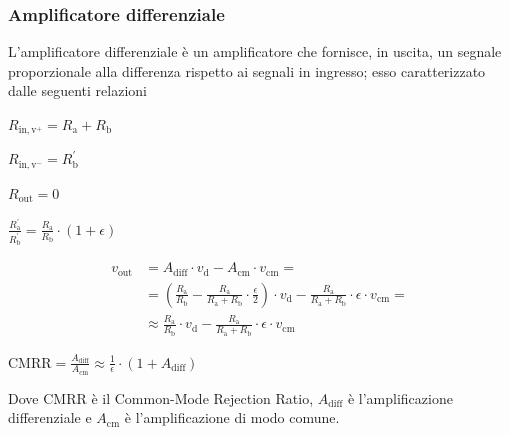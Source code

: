 \documentclass[a4paper]{article}
\begin{document}
			\subsubsection{Amplificatore differenziale}
				L'amplificatore differenziale è un amplificatore che fornisce, in uscita, un segnale proporzionale alla differenza rispetto ai segnali in ingresso; esso caratterizzato dalle seguenti relazioni
				\begin{center}
					$ R_{\mathrm{in, v^{+}}} = R_{\mathrm{a}} + R_{\mathrm{b}} $
				\end{center}
				\newline
				\begin{center}
					$ R_{\mathrm{in, v^{-}}} = R_{\mathrm{b}}^{'} $
				\end{center}
				\newline
				\begin{center}
					$ R_{\mathrm{out}} = 0 $
				\end{center}
				\newline
				\begin{center}
					$ \frac{R_{\mathrm{a}}^{'}}{R_{\mathrm{b}}^{'}} = \frac{R_{\mathrm{a}}}{R_{\mathrm{b}}} \cdot (1 + \epsilon) $
				\end{center}
				\newline
				\begin{equation*}
					\begin{split}
						v_{\mathrm{out}} &= A_{\mathrm{diff}} \cdot v_{\mathrm{d}} - A_{\mathrm{cm}} \cdot v_{\mathrm{cm}} = \\
										 &= (\frac{R_{\mathrm{a}}}{R_{\mathrm{b}}} - \frac{R_{\mathrm{a}}}{R_{\mathrm{a}} + R_{\mathrm{b}}} \cdot \frac{\epsilon}{2}) \cdot v_{\mathrm{d}} - \frac{R_{\mathrm{a}}}{R_{\mathrm{a}} + R_{\mathrm{b}}} \cdot \epsilon \cdot v_{\mathrm{cm}} = \\
										 &\approx \frac{R_{\mathrm{a}}}{R_{\mathrm{b}}} \cdot v_{\mathrm{d}} - \frac{R_{\mathrm{a}}}{R_{\mathrm{a}} + R_{\mathrm{b}}} \cdot \epsilon \cdot v_{\mathrm{cm}}
					\end{split}
				\end{equation*}
				\begin{center}
					$ \mathrm{CMRR} = \frac{A_{\mathrm{diff}}}{A_{\mathrm{cm}}} \approx \frac{1}{\epsilon} \cdot (1 + A_{\mathrm{diff}}) $
				\end{center}
				\newline
				Dove $ \mathrm{CMRR} $ è il Common-Mode Rejection Ratio, $ A_{\mathrm{diff}} $ è l'amplificazione differenziale e $ A_{\mathrm{cm}} $ è l'amplificazione di modo comune.
\end{document}
